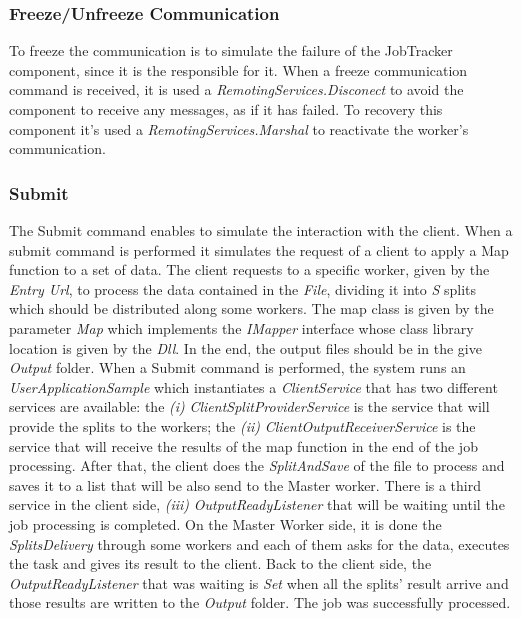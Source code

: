 \documentclass[times, 10pt,twocolumn]{article}
\begin{document}
          \subsubsection{Freeze/Unfreeze Communication}
          
          To freeze the communication is to simulate the failure of the JobTracker component, since it is the responsible for it. When a freeze communication command is received, it is used a \emph{RemotingServices.Disconect} to avoid the component to receive any messages, as if it has failed. To recovery this component it's used a \emph{RemotingServices.Marshal} to reactivate the worker's communication.

            \subsubsection{Submit}
            
            The Submit command enables to simulate the interaction with the client. When a submit command is performed it simulates the request of a client to apply a Map function to a set of data. The client requests to a specific worker, given by the \emph{Entry Url}, to process the data contained in the \emph{File}, dividing it into \emph{S} splits which should be distributed along some workers. The map class is given by the parameter \emph{Map} which implements the \emph{IMapper} interface whose class library location is given by the \emph{Dll}. In the end, the output files should be in the give \emph{Output} folder. When a Submit command is performed, the system runs an \emph{UserApplicationSample} which instantiates a \emph{ClientService} that has two different services are available: the {\it (i)} \emph{ClientSplitProviderService} is the service that will provide the splits to the workers; the {\it (ii)} \emph{ClientOutputReceiverService} is the service that will receive the results of the map function in the end of the job processing.
            After that, the client does the \emph{SplitAndSave} of the file to process and saves it to a list that will be also send to the Master worker.
            There is a third service in the client side, {\it (iii)} \emph{OutputReadyListener} that will be waiting until the job processing is completed.
            On the Master Worker side, it is done the \emph{SplitsDelivery} through some workers and each of them asks for the data, executes the task and gives its result to the client.
            Back to the client side, the \emph{OutputReadyListener} that was waiting is \emph{Set} when all the splits' result arrive and those results are written to the \emph{Output} folder. The job was successfully processed.
\end{document}
